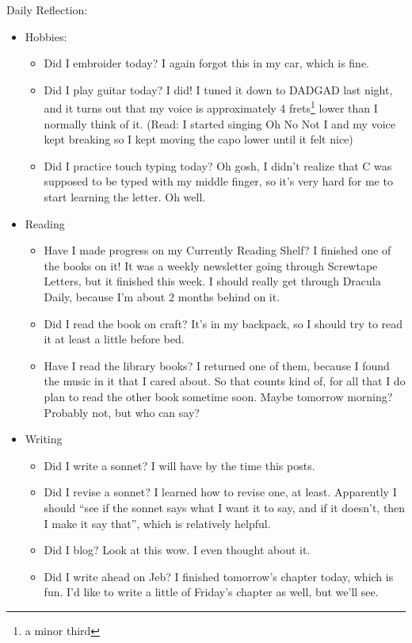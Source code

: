 \documentclass[12pt]{article}[titlepage]
\newcommand{\say}[1]{``#1''}
\renewcommand{\,}{\textsuperscript{,}}
\begin{document}
Daily Reflection:
\begin{itemize}
\item Hobbies:
\begin{itemize}
\item Did I embroider today? I again forgot this in my car, which is fine.
\item Did I play guitar today? I did! I tuned it down to DADGAD last night, and it turns out that my voice is approximately 4 frets\footnote{a minor third} lower than I normally think of it. (Read: I started singing Oh No Not I and my voice kept breaking so I kept moving the capo lower until it felt nice)
\item Did I practice touch typing today? Oh gosh, I didn't realize that C was supposed to be typed with my middle finger, so it's very hard for me to start learning the letter. Oh well.
\end{itemize}
\item Reading
\begin{itemize}
\item Have I made progress on my Currently Reading Shelf? I finished one of the books on it! It was a weekly newsletter going through Screwtape Letters, but it finished this week. I should really get through Dracula Daily, because I'm about 2 months behind on it.
\item Did I read the book on craft? It's in my backpack, so I should try to read it at least a little before bed.
\item Have I read the library books? I returned one of them, because I found the music in it that I cared about. So that counts kind of, for all that I do plan to read the other book sometime soon. Maybe tomorrow morning? Probably not, but who can say?
\end{itemize}
\item Writing
\begin{itemize}
\item Did I write a sonnet? I will have by the time this posts.
\item Did I revise a sonnet? I learned how to revise one, at least. Apparently I should \say{see if the sonnet says what I want it to say, and if it doesn't, then I make it say that}, which is relatively helpful.
\item Did I blog? Look at this wow. I even thought about it.
\item Did I write ahead on Jeb? I finished tomorrow's chapter today, which is fun. I'd like to write a little of Friday's chapter as well, but we'll see.

\end{itemize}
\end{itemize}
\end{document}

